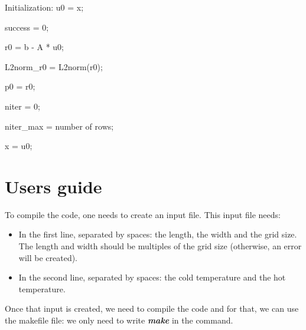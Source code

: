 \documentclass{article}
\begin{document}
\begin{algorithm}[H]
 \SetAlgoLined
 Initialization: u0 = x;
 
 success = 0; 
 
 r0 = b - A * u0;
 
 L2norm\_r0 = L2norm(r0);
 
 p0 = r0;
 
 niter = 0; 
 
 niter\_max = number of rows;
 
 x = u0; 
 
\end{algorithm}

\section{Users guide}

To compile the code, one needs to create an input file. This input
file needs:
\begin{itemize}
    \item In the first line, separated by spaces: the length, 
    the width and the grid size. The length and width should be 
    multiples of the grid size (otherwise, an error will be 
    created).
    \item In the second line, separated by spaces: the cold temperature
     and the hot temperature.
\end{itemize}

Once that input is created, we need to compile the code and for that,
 we can use the makefile file: we only need to write 
 \textbf{\textit{make}} in the 
 command.
\end{document}
